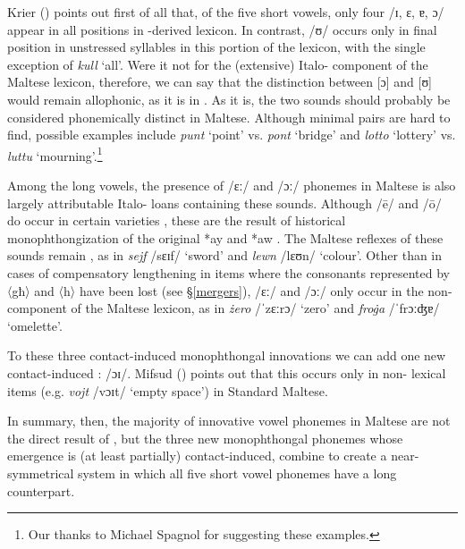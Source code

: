 \documentclass[output=paper]{langsci/langscibook}
\begin{document}
Krier (\citeyear[21]{krier1976}) points out first of all that, of the five short vowels, only four /ɪ, ɛ, ɐ, ɔ/ appear in all positions in -derived lexicon. In contrast, /ʊ/ occurs only in final position in unstressed syllables in this portion of the lexicon, with the single exception of \textit{kull} `all'. Were it not for the (extensive) Italo- component of the Maltese lexicon, therefore, we can say that the distinction between [ɔ] and [ʊ] would remain allophonic, as it is in  . As it is, the two sounds should probably be considered phonemically distinct in Maltese. Although minimal pairs are hard to find, possible examples include \textit{punt} `point' vs. \textit{pont} `bridge' and \textit{lotto} `lottery' vs. \textit{luttu} `mourning'.\footnote{Our thanks to Michael Spagnol for suggesting these examples.}


Among the long vowels, the presence of /ɛː/ and /ɔː/ phonemes in Maltese is also largely attributable Italo- loans containing these sounds. Although /\={e}/ and /\={o}/ do occur in certain   varieties \citep{Gibson2011,HerinZammit2017}, these are the result of historical monophthongization of the original *ay and *aw . The Maltese reflexes of these sounds remain , as in \textit{sejf} /sɛɪf/ `sword' and \textit{lewn} /lɛʊn/ `colour'. Other than in cases of compensatory lengthening in items where the consonants represented by 〈għ〉 and 〈h〉 have been lost (see §\ref{mergers}), /ɛː/ and /ɔː/ only occur in the non- component of the Maltese lexicon, as in \textit{żero} /ˈzɛːrɔ/ `zero' and \textit{froġa} /ˈfrɔːʤɐ/ `omelette'.

To these three contact-induced monophthongal innovations we can add one new contact-induced : /ɔɪ/. Mifsud (\citeyear{mifsud2011}) points out that this occurs only in non- lexical items (e.g. \textit{vojt} /vɔɪt/ `empty space') in  Standard Maltese.

In summary, then, the majority of innovative vowel phonemes in Maltese are not the direct result of , but the three new monophthongal phonemes whose emergence is (at least partially) contact-induced, combine to create a near-symmetrical system in which all five short vowel phonemes have a long counterpart.
\end{document}
